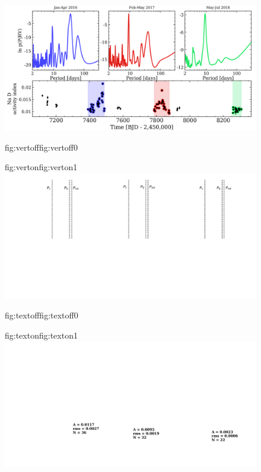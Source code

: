 \begin{figure}
  \centering
  \includegraphics[width=\hsize]{figures/temporal_bkgd.png}%
  \hspace{-\hsize}%
  \begin{ocg}{fig:vertoff}{fig:vertoff}{0}%
  \end{ocg}%
  \begin{ocg}{fig:verton}{fig:verton}{1}%
  \includegraphics[width=\hsize]{figures/temporal_vert.png}%
  \end{ocg}
  \hspace{-\hsize}%
  \begin{ocg}{fig:textoff}{fig:textoff}{0}%
  \end{ocg}%
  \begin{ocg}{fig:texton}{fig:texton}{1}%
  \includegraphics[width=\hsize]{figures/temporal_text.png}%

\end{ocg}
\end{figure}
